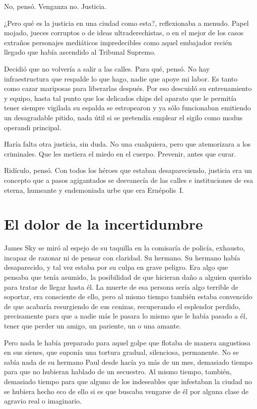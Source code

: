 No, pensó. Venganza no. Justicia.

¿Pero qué es la justicia en una ciudad como esta?, reflexionaba a menudo. Papel mojado, jueces corruptos o de ideas ultraderechistas, o en el mejor de los casos extraños personajes mediáticos impredecibles como aquel embajador recién llegado que había ascendido al Tribunal Supremo.

Decidió que no volvería a salir a las calles. Para qué, pensó. No hay infraestructura que respalde lo que hago, nadie que apoye mi labor. Es tanto como cazar mariposas para liberarlas después. Por eso descuidó su entrenamiento y equipo, hasta tal punto que los delicados chips del aparato que le permitía tener siempre vigilada su espalda se estropearon y ya sólo funcionaban emitiendo un desagradable pitido, nada útil si se pretendía emplear el sigilo como modus operandi principal.

Haría falta otra justicia, sin duda. No una cualquiera, pero que atemorizara a los criminales. Que les metiera el miedo en el cuerpo. Prevenir, antes que curar.

Ridículo, pensó. Con todos los héroes que estaban desapareciendo, justicia era un concepto que a pasos agigantados se desvanecía de las calles e instituciones de esa eterna, humeante y endemoniada urbe que era Ernépolis~I.

\section*{El dolor de la incertidumbre}

James Sky se miró al espejo de su taquilla en la comisaría de policía, exhausto, incapaz de razonar ni de pensar con claridad. Su hermano. Su hermano había desaparecido, y tal vez estaba por su culpa en grave peligro. Era algo que pensaba que tenía asumido, la posibilidad de que hicieran daño a alguien querido para tratar de llegar hasta él. La muerte de esa persona sería algo terrible de soportar, era consciente de ello, pero al mismo tiempo también estaba convencido de que acabaría resurgiendo de sus cenizas, recuperando el esplendor perdido, precisamente para que a nadie más le pasara lo mismo que le había pasado a él, tener que perder un amigo, un pariente, un o una amante.

Pero nada le había preparado para aquel golpe que flotaba de manera angustiosa en sus sienes, que suponía una tortura gradual, silenciosa, permanente. No se sabía nada de su hermano Paul desde hacía ya más de un mes, demasiado tiempo para que no hubieran hablado de un secuestro. Al mismo tiempo, también, demasiado tiempo para que alguno de los indeseables que infestaban la ciudad no se hubiera hecho eco de ello si es que buscaba vengarse de él por alguna clase de agravio real o imaginario.

